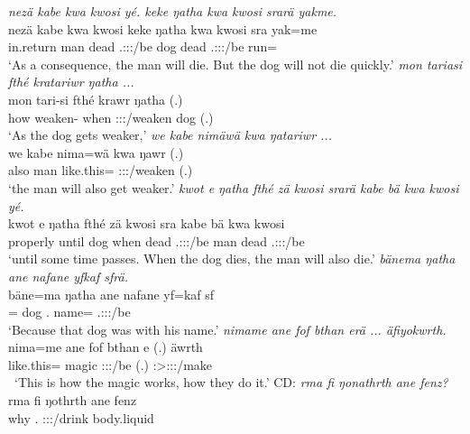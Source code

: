 \begin{exe}
	\emph{nezä kabe kwa kwosi yé. keke ŋatha kwa kwosi srarä yakme.}\\
	\gll nezä kabe kwa kwosi  keke ŋatha kwa kwosi sra yak=me\\
	in.return man \Fut{} dead \Tsg.\Masc:\Sbj:\Nonpast:\Ipfv/be \Neg{} dog \Fut{} dead \Tsg.\Masc:\Sbj:\Irr:\Ipfv/be run=\Ins\\
	\trans `As a consequence, the man will die. But the dog will not die quickly.'
	\emph{mon tariasi fthé kratariwr ŋatha ...}\\
	\gll mon tari-si fthé krawr ŋatha (.)\\
	how weaken-\Nmlz{} when \Stsg:\Sbj:\Irr:\Ipfv/weaken dog (.)\\
	\trans `As the dog gets weaker,'
	\emph{we kabe nimäwä kwa ŋatariwr ...}\\
	\gll we kabe nima=wä kwa ŋawr (.)\\
	also man like.this=\Emph{} \Fut{} \Stsg:\Sbj:\Nonpast:\Ipfv/weaken (.)\\
	\trans `the man will also get weaker.'
	\emph{kwot e ŋatha fthé zä kwosi srarä kabe bä kwa kwosi yé.}\\
	\gll kwot e ŋatha fthé zä kwosi sra kabe bä kwa kwosi \\
	properly until dog when \Prox{} dead \Tsg.\Masc:\Sbj:\Irr:\Ipfv/be man \Med{} \Fut{} dead \Tsg.\Masc:\Sbj:\Nonpast:\Ipfv/be\\
	\trans `until some time passes. When the dog dies, the man will also die.'
	\emph{bänema ŋatha ane nafane yfkaf sfrä.}\\
	\gll bäne=ma ŋatha ane nafane yf=kaf sf\\
	\Recog=\Char{} dog \Dem{} \Tsg.\Poss{} name=\Prop{} \Tsg.\Masc:\Sbj:\Rpst:\Ipfv/be\\
	\trans `Because that dog was with his name.'
	\emph{nimame ane fof bthan erä ... äfiyokwrth.}\\
	\gll nima=me ane fof bthan e (.) äwrth\\
	like.this=\Ins{} \Dem{} \Emph{} magic \Stpl:\Sbj:\Nonpast:\Ipfv/be (.) \Stpl:\Sbj>\Stpl:\Obj:\Nonpast:\Ipfv/make\\\
	\trans `This is how the magic works, how they do it.'
	\textsc{CD}: \emph{rma fi ŋonathrth ane fenz?}\\
	\gll rma fi ŋothrth ane fenz\\
	why \Third.\Abs{} \Stpl:\Sbj:\Nonpast:\Ipfv/drink \Dem{} body.liquid\\

\end{exe}

